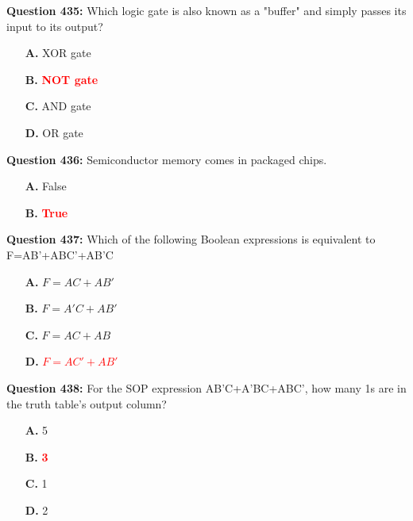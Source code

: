 \documentclass[12pt,a4paper]{article}
\begin{document}
\vspace{0.5cm}

\textbf{Question 435:} Which logic gate is also known as a "buffer" and simply passes its input to its output?

\begin{itemize}
    \item[\textbf{A.}] XOR gate
    \item[\textbf{B.}] \textcolor{red}{\textbf{NOT gate}}
    \item[\textbf{C.}] AND gate
    \item[\textbf{D.}] OR gate
\end{itemize}

\vspace{0.5cm}

\textbf{Question 436:} Semiconductor memory comes in packaged chips.

\begin{itemize}
    \item[\textbf{A.}] False
    \item[\textbf{B.}] \textcolor{red}{\textbf{True}}
\end{itemize}

\vspace{0.5cm}

\textbf{Question 437:} Which of the following Boolean expressions is equivalent to F=AB'+ABC'+AB'C

\begin{itemize}
    \item[\textbf{A.}] $F = AC + AB'$
    \item[\textbf{B.}] $F = A'C + AB'$
    \item[\textbf{C.}] $F = AC + AB$
    \item[\textbf{D.}] \textcolor{red}{\textbf{$F = AC' + AB'$}}
\end{itemize}

\vspace{0.5cm}

\textbf{Question 438:} For the SOP expression AB'C+A'BC+ABC', how many 1s are in the truth table's output column?

\begin{itemize}
    \item[\textbf{A.}] 5
    \item[\textbf{B.}] \textcolor{red}{\textbf{3}}
    \item[\textbf{C.}] 1
    \item[\textbf{D.}] 2
\end{itemize}
\end{document}
